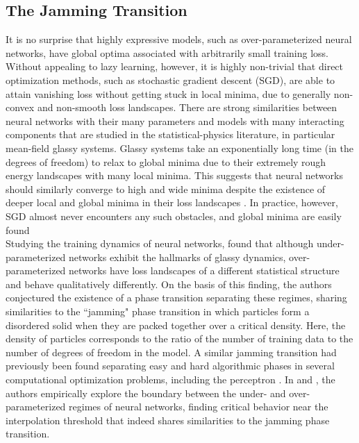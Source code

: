\documentclass[11pt]{article}
\begin{document}
\subsection{The Jamming Transition}

It is no surprise that highly expressive models, such as over-parameterized neural networks, have global optima associated with arbitrarily small training loss. Without appealing to lazy learning, however, it is highly non-trivial that direct optimization methods, such as stochastic gradient descent (SGD), are able to attain vanishing loss without getting stuck in local minima, due to generally non-convex and non-smooth loss landscapes. There are strong similarities between neural networks with their many parameters and models with many interacting components that are studied in the statistical-physics literature, in particular mean-field glassy systems. Glassy systems take an exponentially long time (in the degrees of freedom) to relax to global minima due to their extremely rough energy landscapes with many local minima. This suggests that neural networks should similarly converge to high and wide minima despite the existence of deeper local and global minima in their loss landscapes \cite{choromanskaLossSurfacesMultilayer}. In practice, however, SGD almost never encounters any such obstacles, and global minima are easily found \cite{goodfellowQualitativelyCharacterizingNeural2015}\\

Studying the training dynamics of neural networks, \cite{baity-jesiComparingDynamicsDeep2019} found that although under-parameterized networks exhibit the hallmarks of glassy dynamics, over-parameterized networks have loss landscapes of a different statistical structure and behave qualitatively differently. On the basis of this finding, the authors conjectured the existence of a phase transition separating these regimes, sharing similarities to the ``jamming" phase transition in which particles form a disordered solid when they are packed together over a critical density. Here, the density of particles corresponds to the ratio of the number of training data to the number of degrees of freedom in the model. A similar jamming transition had previously been found separating easy and hard algorithmic phases in several computational optimization problems, including the perceptron \cite{krzakalaLandscapeAnalysisConstraint2007,franzUniversalitySATUNSATJamming2017,franzSimplestModelJamming2016}. In \cite{geigerJammingTransitionParadigm2019} and \cite{spiglerJammingTransitionOverparametrization2019}, the authors empirically explore the boundary between the under- and over-parameterized regimes of neural networks, finding critical behavior near the interpolation threshold that indeed shares similarities to the jamming phase transition.\\
\end{document}
